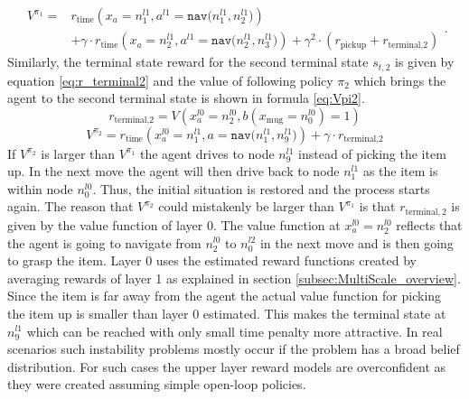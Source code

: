 \begin{equation}
    \begin{aligned}
        V^{\pi_1} = &r_\text{time}(x_a=n_1^{l1}, a^{l1}=\texttt{nav($n_1^{l1}, n_2^{l1}$)})\\ 
        &+ \gamma\cdot r_\text{time}(x_a=n_2^{l1}, a^{l1}=\texttt{nav($n_2^{l1}, n_3^{l1}$)}) + \gamma^2 \cdot (r_\text{pickup} + r_{\text{terminal,}2})
    \end{aligned}.
\end{equation}
Similarly, the terminal state reward for the second terminal state $s_{t,2}$ is given by equation \ref{eq:r_terminal2} and the value of following policy $\pi_2$ which brings the agent to the second terminal state is shown in formula \ref{eq:Vpi2}.
\begin{equation}\label{eq:r_terminal2}
    r_{\text{terminal,}2} = V\left( x_a^{l0}=n_2^{l0}, b(x_\text{mug}=n_0^{l0})=1 \right)
\end{equation}
%
\begin{equation}\label{eq:Vpi2}
V^{\pi_2}=r_\text{time}\left( x_a^{l0}=n_1^{l1}, a=\texttt{nav($n_1^{l1}, n_9^{l1}$)} \right) + \gamma \cdot r_{\text{terminal,}2}
\end{equation}
If $V^{\pi_2}$ is larger than $V^{\pi_1}$ the agent drives to node $n_9^{l1}$ instead of picking the item up. In the next move the agent will then drive back to node $n_1^{l1}$ as the item is within node $n_0^{l0}$. Thus, the initial situation is restored and the process starts again. The reason that $V^{\pi_2}$ could mistakenly be larger than $V^{\pi_1}$ is that $r_{\text{terminal},2}$ is given by the value function of layer 0. The value function at $x_a^{l0}=n_2^{l0}$ reflects that the agent is going to navigate from $n_2^{l0}$ to $n_0^{l2}$ in the next move and is then going to grasp the item. Layer 0 uses the estimated reward functions created by averaging rewards of layer 1 as explained in section \ref{subsec:MultiScale_overview}. Since the item is far away from the agent the actual value function for picking the item up is smaller than layer 0 estimated. This makes the terminal state at $n_9^{l1}$ which can be reached with only small time penalty more attractive. In real scenarios such instability problems mostly occur if the problem has a broad belief distribution. For such cases the upper layer reward models are overconfident as they were created assuming simple open-loop policies.   

